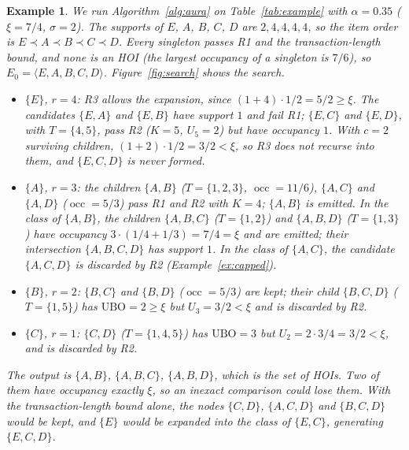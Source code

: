 \documentclass[pdflatex,sn-mathphys,Numbered]{sn-jnl}
\theoremstyle{thmstyleone}
\theoremstyle{thmstyletwo}
\newtheorem{example}{Example}
\theoremstyle{thmstylethree}
\newcommand{\socc}{\operatorname{occ}}
\newcommand{\Ubo}{\mathrm{UBO}}
\newcommand{\Ucap}{U}
\begin{document}
\begin{example}\label{ex:search}
We run Algorithm~\ref{alg:aura} on Table~\ref{tab:example} with $\alpha = 0.35$ ($\xi = 7/4$, $\sigma = 2$). The supports of $E$, $A$, $B$, $C$, $D$ are $2, 4, 4, 4, 4$, so the item order is $E \prec A \prec B \prec C \prec D$. Every singleton passes R1 and the transaction-length bound, and none is an HOI (the largest occupancy of a singleton is $7/6$), so $E_0 = \langle E, A, B, C, D \rangle$. Figure~\ref{fig:search} shows the search.
\begin{itemize}
\item $\{E\}$, $r = 4$: R3 allows the expansion, since $(1 + 4) \cdot 1/2 = 5/2 \ge \xi$. The candidates $\{E,A\}$ and $\{E,B\}$ have support $1$ and fail R1; $\{E,C\}$ and $\{E,D\}$, with $T = \{4,5\}$, pass R2 ($K = 5$, $\Ucap_5 = 2$) but have occupancy $1$. With $c = 2$ surviving children, $(1 + 2) \cdot 1/2 = 3/2 < \xi$, so R3 does not recurse into them, and $\{E,C,D\}$ is never formed.
\item $\{A\}$, $r = 3$: the children $\{A,B\}$ ($T = \{1,2,3\}$, $\socc = 11/6$), $\{A,C\}$ and $\{A,D\}$ ($\socc = 5/3$) pass R1 and R2 with $K = 4$; $\{A,B\}$ is emitted. In the class of $\{A,B\}$, the children $\{A,B,C\}$ ($T = \{1,2\}$) and $\{A,B,D\}$ ($T = \{1,3\}$) have occupancy $3 \cdot (1/4 + 1/3) = 7/4 = \xi$ and are emitted; their intersection $\{A,B,C,D\}$ has support $1$. In the class of $\{A,C\}$, the candidate $\{A,C,D\}$ is discarded by R2 (Example~\ref{ex:capped}).
\item $\{B\}$, $r = 2$: $\{B,C\}$ and $\{B,D\}$ ($\socc = 5/3$) are kept; their child $\{B,C,D\}$ ($T = \{1,5\}$) has $\Ubo = 2 \ge \xi$ but $\Ucap_3 = 3/2 < \xi$ and is discarded by R2.
\item $\{C\}$, $r = 1$: $\{C,D\}$ ($T = \{1,4,5\}$) has $\Ubo = 3$ but $\Ucap_2 = 2 \cdot 3/4 = 3/2 < \xi$, and is discarded by R2.
\end{itemize}
The output is $\{A,B\}$, $\{A,B,C\}$, $\{A,B,D\}$, which is the set of HOIs. Two of them have occupancy exactly $\xi$, so an inexact comparison could lose them. With the transaction-length bound alone, the nodes $\{C,D\}$, $\{A,C,D\}$ and $\{B,C,D\}$ would be kept, and $\{E\}$ would be expanded into the class of $\{E,C\}$, generating $\{E,C,D\}$.
\end{example}
\end{document}
